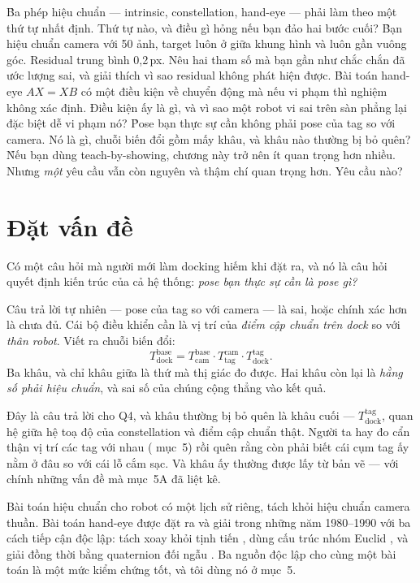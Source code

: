 \documentclass[../../marker.tex]{subfiles}
\begin{document}
\begin{khoigoi}
\h{Ba phép hiệu chuẩn --- intrinsic, constellation, hand-eye --- phải làm theo một thứ tự nhất định. Thứ tự nào, và điều gì hỏng nếu bạn đảo hai bước cuối?}
\h{Bạn hiệu chuẩn camera với 50 ảnh, target luôn ở giữa khung hình và luôn gần vuông góc. Residual trung bình 0,2\,px. Nêu hai tham số mà bạn gần như chắc chắn đã ước lượng sai, và giải thích vì sao residual không phát hiện được.}
\h{Bài toán hand-eye \(AX = XB\) có một điều kiện về chuyển động mà nếu vi phạm thì nghiệm không xác định. Điều kiện ấy là gì, và vì sao một robot vi sai trên sàn phẳng lại đặc biệt dễ vi phạm nó?}
\h{Pose bạn thực sự cần không phải pose của tag so với camera. Nó là gì, chuỗi biến đổi gồm mấy khâu, và khâu nào thường bị bỏ quên?}
\h{Nếu bạn dùng teach-by-showing, chương này trở nên ít quan trọng hơn nhiều. Nhưng \emph{một} yêu cầu vẫn còn nguyên và thậm chí quan trọng hơn. Yêu cầu nào?}
\end{khoigoi}

\section{Đặt vấn đề}

Có một câu hỏi mà người mới làm docking hiếm khi đặt ra, và nó là câu hỏi quyết định kiến trúc của cả hệ thống: \emph{pose bạn thực sự cần là pose gì?}

Câu trả lời tự nhiên --- pose của tag so với camera --- là sai, hoặc chính xác hơn là chưa đủ. Cái bộ điều khiển cần là vị trí của \emph{điểm cập chuẩn trên dock} so với \emph{thân robot}. Viết ra chuỗi biến đổi:
\begin{equation}
T^{\text{base}}_{\text{dock}} = T^{\text{base}}_{\text{cam}} \cdot T^{\text{cam}}_{\text{tag}} \cdot T^{\text{tag}}_{\text{dock}} .
\label{eq:b12-chuoi}
\end{equation}
Ba khâu, và chỉ khâu giữa là thứ mà thị giác đo được. Hai khâu còn lại là \emph{hằng số phải hiệu chuẩn}, và sai số của chúng cộng thẳng vào kết quả.

Đây là câu trả lời cho Q4, và khâu thường bị bỏ quên là khâu cuối --- \(T^{\text{tag}}_{\text{dock}}\), quan hệ giữa hệ toạ độ của constellation và điểm cập chuẩn thật. Người ta hay đo cẩn thận vị trí các tag với nhau ( mục~5) rồi quên rằng còn phải biết cái cụm tag ấy nằm ở đâu so với cái lỗ cắm sạc. Và khâu ấy thường được lấy từ bản vẽ --- với chính những vấn đề mà  mục~5A đã liệt kê.

Bài toán hiệu chuẩn cho robot có một lịch sử riêng, tách khỏi hiệu chuẩn camera thuần. Bài toán hand-eye được đặt ra và giải trong những năm 1980--1990 với ba cách tiếp cận độc lập: tách xoay khỏi tịnh tiến \cite{tsai1989handeye}, dùng cấu trúc nhóm Euclid \cite{park1994robot}, và giải đồng thời bằng quaternion đối ngẫu \cite{daniilidis1999handeye}. Ba nguồn độc lập cho cùng một bài toán là một mức kiểm chứng tốt, và tôi dùng nó ở mục~5.
\end{document}
